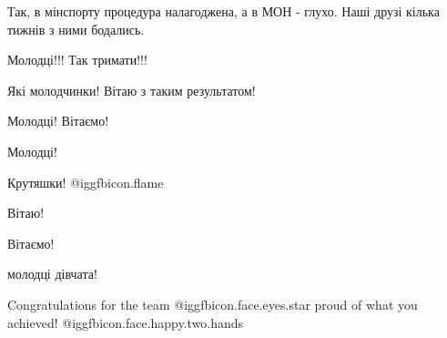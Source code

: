 \begin{itemize}
\begin{itemize}
Так, в мінспорту процедура налагоджена, а в МОН - глухо. Наші друзі кілька тижнів з ними бодались.
\end{itemize} %

Молодці!!! Так тримати!!!

Які молодчинки! Вітаю з таким результатом!

Молодці! Вітаємо!

Молодці!

Крутяшки!  @igg{fbicon.flame} 

Вітаю!

Вітаємо!

молодці дівчата!

Congratulations
for the team  @igg{fbicon.face.eyes.star}  proud of what you achieved!  @igg{fbicon.face.happy.two.hands} 

\end{itemize} %
